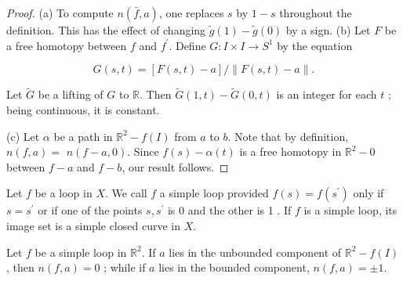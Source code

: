 \begin{proof}
(a) To compute \(n( {\bar{f},a})\), one replaces \(s\) by \(1 - s\) throughout the definition. This has the effect of changing \(\tilde{g}(1) - \tilde{g}( 0)\) by a sign.
(b) Let \(F\) be a free homotopy between \(f\) and \(f^{\prime }\). Define \(G : I \times I \rightarrow {S}^{1}\) by the equation

\[
G( {s,t}) = [ {F( {s,t}) - a}] /\parallel F( {s,t}) - a\parallel .
\]

Let \(\tilde{G}\) be a lifting of \(G\) to \(\mathbb{R}\). Then \(\tilde{G}( {1,t}) - \tilde{G}( {0,t})\) is an integer for each \(t\) ; being continuous, it is constant.

(c) Let \(\alpha\) be a path in \(\mathbb{R}^{2} - f( I)\) from \(a\) to \(b\). Note that by definition, \(n( {f,a}) =\) \(n( {f - a,0})\). Since \(f( s) - \alpha ( t)\) is a free homotopy in \(\mathbb{R}^{2} - 0\) between \(f - a\) and \(f - b\), our result follows.
\end{proof}
\begin{definition}
Let \(f\) be a loop in \(X\). We call \(f\) a simple loop provided \(f( s) = f( s^{\prime })\) only if \(s = s^{\prime }\) or if one of the points \(s,s^{\prime }\) is 0 and the other is 1 . If \(f\) is a simple loop, its image set is a simple closed curve in \(X\).
\end{definition}

\begin{theorem}
\label{thm:\thetheorem}
Let \(f\) be a simple loop in \(\mathbb{R}^{2}\). If \(a\) lies in the unbounded component of \(\mathbb{R}^{2} - f( I)\), then \(n( {f,a}) = 0\) ; while if \(a\) lies in the bounded component, \(n( {f,a}) = \pm 1\).
\end{theorem}

